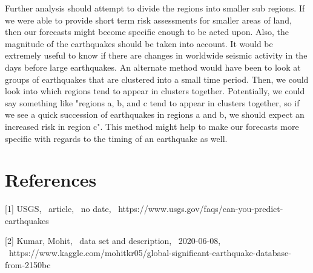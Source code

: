 \documentclass{article}
\begin{document}
Further analysis should attempt to divide the regions into smaller sub regions. If we were able to provide short term risk assessments for smaller areas of land, then our forecasts might become specific enough to be acted upon. Also, the magnitude of the earthquakes should be taken into account. It would be extremely useful to know if there are changes in worldwide seismic activity in the days before large earthquakes. An alternate method would have been to look at groups of earthquakes that are clustered into a small time period. Then, we could look into which regions tend to appear in clusters together. Potentially, we could say something like "regions a, b, and c tend to appear in clusters together, so if we see a quick succession of earthquakes in regions a and b, we should expect an increased risk in region c". This method might help to make our forecasts more specific with regards to the timing of an earthquake as well. 

\section*{References}



{
\small

[1] USGS, \ article, \ no date, \  https://www.usgs.gov/faqs/can-you-predict-earthquakes

[2] Kumar, Mohit, \ data set and description, \ 2020-06-08, \  https://www.kaggle.com/mohitkr05/global-significant-earthquake-database-from-2150bc
}
\end{document}
